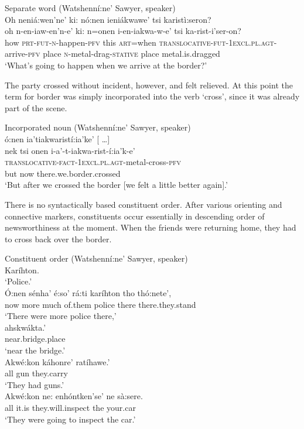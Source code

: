 \documentclass[output=paper,colorlinks,citecolor=brown]{langscibook}
\begin{document}
\ea Separate word (Watshenní:ne' Sawyer, speaker)\\
\label{ex:mithun:1}
\glll  Oh   neniá:wen’ne’    ki: nó:nen  ieniákwawe’     tsi karistì:seron?\\
       oh   n-en-iaw-en’n-e’ ki: n=onen  i-en-iakwa-w-e’ tsi ka-rist-i’ser-on?\\
      how  \textsc{prt-fut-n}-happen-\textsc{pfv} this \textsc{art}=when \textsc{translocative-fut-1excl.pl.agt}-arrive-\textsc{pfv} place  \textsc{n}-metal-drag-\textsc{stative} place {metal.is.dragged}\\
\glt `What's going to happen when we arrive at the border?’
\z

The party crossed without incident, however, and felt relieved. At this point the term for border was simply incorporated into the verb `cross', since it was already part of the scene.

\ea Incorporated noun (Watshenní:ne' Sawyer, speaker)\\
  ó:nen                            {ia'tiakwaristí:ia'ke'  {[} \ldots {]}}\\
       {nek tsi}  onen                             i-a'-t-iakwa-rist-í:ia'k-e'\\
       {}         {}                               \textsc{translocative-fact-1excl.pl.agt}-metal-cross-\textsc{pfv}\\
       but        now                              {there.we.border.crossed}\\
\glt  `But after we crossed the border {[}we felt a little better again{]}.'
\z

There is no syntactically based constituent order. After various orienting and connective markers, constituents occur essentially in descending order of newsworthiness at the moment. When the friends were returning home, they had to cross back over the border.

\ea Constituent order (Watshenní:ne' Sawyer, speaker)\\
Karíhton.\\
\glt `Police.'\medskip\\
\gll Ó:nen sénha' é:so' rá:ti karíhton tho thó:nete',\\
     now more much {of.them} police there {there.they.stand}\\
\glt `There were more police there,'\medskip\\
     ahskwákta.'\\
     {near.bridge.place}\\
\glt `near the bridge.'\medskip\\
\gll Akwé:kon káhonre' ratíhawe.'\\
     all gun {they.carry}\\
\glt `They had guns.'\medskip\\
\gll Akwé:kon ne: enhóntken'se' ne sà:sere.\\
     all {it.is} {they.will.inspect} the {your.car}\\
\glt `They were going to inspect the car.'
\z
\end{document}
